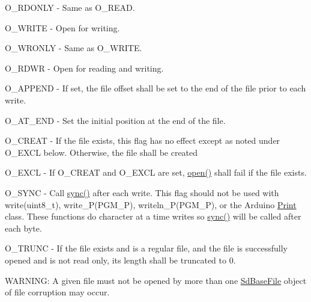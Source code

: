 O\-\_\-\-R\-D\-O\-N\-L\-Y -\/ Same as O\-\_\-\-R\-E\-A\-D.

O\-\_\-\-W\-R\-I\-T\-E -\/ Open for writing.

O\-\_\-\-W\-R\-O\-N\-L\-Y -\/ Same as O\-\_\-\-W\-R\-I\-T\-E.

O\-\_\-\-R\-D\-W\-R -\/ Open for reading and writing.

O\-\_\-\-A\-P\-P\-E\-N\-D -\/ If set, the file offset shall be set to the end of the file prior to each write.

O\-\_\-\-A\-T\-\_\-\-E\-N\-D -\/ Set the initial position at the end of the file.

O\-\_\-\-C\-R\-E\-A\-T -\/ If the file exists, this flag has no effect except as noted under O\-\_\-\-E\-X\-C\-L below. Otherwise, the file shall be created

O\-\_\-\-E\-X\-C\-L -\/ If O\-\_\-\-C\-R\-E\-A\-T and O\-\_\-\-E\-X\-C\-L are set, \hyperlink{class_sd_base_file_a52c7074d47cf3798184d1fbaa7d2711a}{open()} shall fail if the file exists.

O\-\_\-\-S\-Y\-N\-C -\/ Call \hyperlink{class_sd_base_file_a3eb7f41182c04388c951db242c13f845}{sync()} after each write. This flag should not be used with write(uint8\-\_\-t), write\-\_\-\-P(\-P\-G\-M\-\_\-\-P), writeln\-\_\-\-P(\-P\-G\-M\-\_\-\-P), or the Arduino \hyperlink{class_print}{Print} class. These functions do character at a time writes so \hyperlink{class_sd_base_file_a3eb7f41182c04388c951db242c13f845}{sync()} will be called after each byte.

O\-\_\-\-T\-R\-U\-N\-C -\/ If the file exists and is a regular file, and the file is successfully opened and is not read only, its length shall be truncated to 0.

W\-A\-R\-N\-I\-N\-G\-: A given file must not be opened by more than one \hyperlink{class_sd_base_file}{Sd\-Base\-File} object of file corruption may occur.

